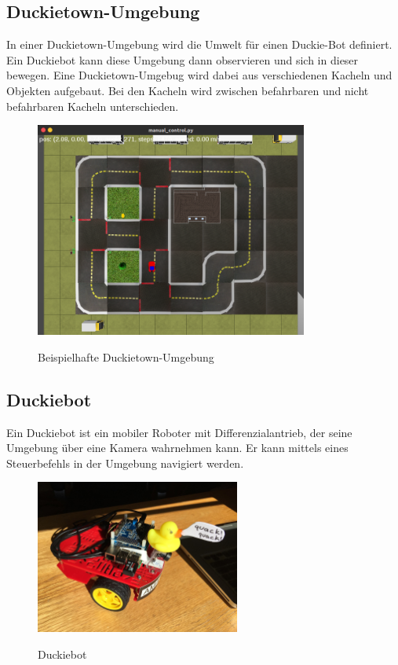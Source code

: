 \subsection{Duckietown-Umgebung}

In einer Duckietown-Umgebung wird die Umwelt für einen Duckie-Bot definiert. Ein Duckiebot kann diese Umgebung dann observieren und sich in dieser bewegen. Eine Duckietown-Umgebug wird dabei aus verschiedenen Kacheln und Objekten aufgebaut. Bei den Kacheln wird zwischen befahrbaren und nicht befahrbaren Kacheln unterschieden. 

\begin{figure}[H]
	\centering
	\includegraphics[width=0.8\textwidth]{kapitel2/images/duckietown-umgebung.png}
	\label{fig:duckietown-umgebung}
	\caption{Beispielhafte Duckietown-Umgebung}
\end{figure}


\subsection{Duckiebot}

Ein Duckiebot ist ein mobiler Roboter mit Differenzialantrieb, der seine Umgebung über eine Kamera wahrnehmen kann. Er kann mittels eines Steuerbefehls in der Umgebung navigiert werden. \cite{duckietown_platform}

\begin{figure}[H]
	\centering
	\includegraphics[width=0.6\textwidth]{kapitel2/images/duckiebot.jpg}
	\label{fig:duckiebot}
	\caption{Duckiebot}
\end{figure}


